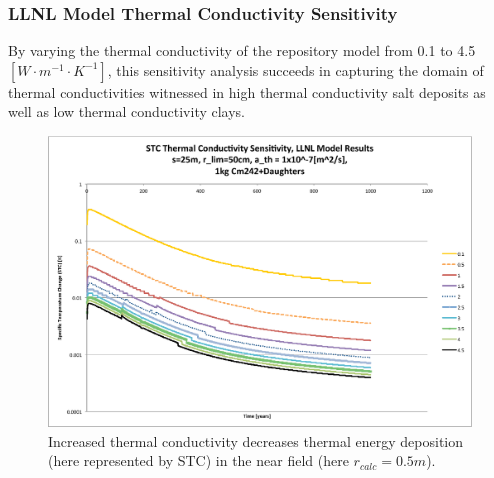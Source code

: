 

\begin{frame}[ctb!]
\frametitle{LLNL Model Thermal Conductivity Sensitivity}
By varying the thermal conductivity of the repository model from 0.1 to 4.5 
$[W\cdot m^{-1} \cdot K^{-1}]$, this sensitivity analysis succeeds in capturing 
the domain of thermal conductivities witnessed in high thermal conductivity 
salt deposits as well as low thermal conductivity clays.


\begin{figure}[htbp!]
\begin{center}
\includegraphics[height=0.7\textheight]{./thermal_demonstration/conductivity/Cm242kth_alpha_low.eps}
\end{center}
\caption[$K_{th}$ Sensitivity for Low $\alpha_{th}$ in LLNL Model]{Increased thermal conductivity decreases thermal energy deposition 
(here represented by STC) in the near field (here $r_{calc} = 0.5m$).}
\label{fig:Cm242Kth_alpha_low}
\end{figure}

\end{frame}



